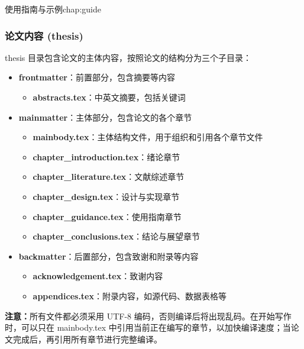 \begin{cuzchapter}{使用指南与示例}{chap:guide}
    \subsubsection{论文内容 (thesis)}\label{subsub:thesis}

    thesis 目录包含论文的主体内容，按照论文的结构分为三个子目录：

    \begin{itemize}
        \item \textbf{frontmatter}：前置部分，包含摘要等内容
            \begin{itemize}
                \item \textbf{abstracts.tex}：中英文摘要，包括关键词
            \end{itemize}

        \item \textbf{mainmatter}：主体部分，包含论文的各个章节
            \begin{itemize}
                \item \textbf{mainbody.tex}：主体结构文件，用于组织和引用各个章节文件
                \item \textbf{chapter\_introduction.tex}：绪论章节
                \item \textbf{chapter\_literature.tex}：文献综述章节
                \item \textbf{chapter\_design.tex}：设计与实现章节
                \item \textbf{chapter\_guidance.tex}：使用指南章节
                \item \textbf{chapter\_conclusions.tex}：结论与展望章节
            \end{itemize}

        \item \textbf{backmatter}：后置部分，包含致谢和附录等内容
            \begin{itemize}
                \item \textbf{acknowledgement.tex}：致谢内容
                \item \textbf{appendices.tex}：附录内容，如源代码、数据表格等
            \end{itemize}
    \end{itemize}

    \begin{leftbar}
        \noindent\textbf{注意：}所有文件都必须采用 UTF-8 编码，否则编译后将出现乱码。在开始写作时，可以只在 mainbody.tex 中引用当前正在编写的章节，以加快编译速度；当论文完成后，再引用所有章节进行完整编译。
    \end{leftbar}


\end{cuzchapter}
